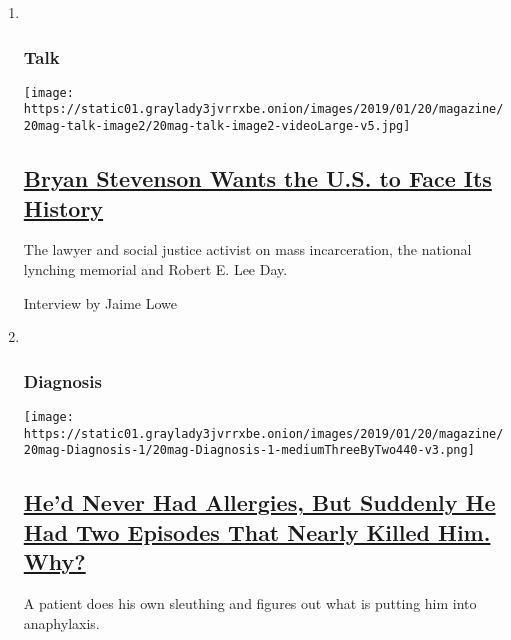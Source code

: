 \begin{enumerate}
\def\labelenumi{\arabic{enumi}.}
\item ~
  \hypertarget{talk}{%
  \subsubsection{Talk}\label{talk}}

  \texttt{[image: https://static01.graylady3jvrrxbe.onion/images/2019/01/20/magazine/20mag-talk-image2/20mag-talk-image2-videoLarge-v5.jpg]}

  \hypertarget{bryan-stevenson-wants-the-us-to-face-its-history}{%
  \subsection{\texorpdfstring{\href{/2019/01/16/magazine/bryan-stevenson-wants-the-us-to-face-its-history.html}{Bryan
  Stevenson Wants the U.S. to Face Its
  History}}{Bryan Stevenson Wants the U.S. to Face Its History}}\label{bryan-stevenson-wants-the-us-to-face-its-history}}

  The lawyer and social justice activist on mass incarceration, the
  national lynching memorial and Robert E. Lee Day.

  Interview by Jaime Lowe
\item ~
  \hypertarget{diagnosis}{%
  \subsubsection{Diagnosis}\label{diagnosis}}

  \texttt{[image: https://static01.graylady3jvrrxbe.onion/images/2019/01/20/magazine/20mag-Diagnosis-1/20mag-Diagnosis-1-mediumThreeByTwo440-v3.png]}

  \hypertarget{hed-never-had-allergies-but-suddenly-he-had-two-episodes-that-nearly-killed-him-why}{%
  \subsection{\texorpdfstring{\href{/2019/01/17/magazine/hed-never-had-allergies-but-suddenly-he-had-two-episodes-that-nearly-killed-him-why.html}{He'd
  Never Had Allergies, But Suddenly He Had Two Episodes That Nearly
  Killed Him.
  Why?}}{He'd Never Had Allergies, But Suddenly He Had Two Episodes That Nearly Killed Him. Why?}}\label{hed-never-had-allergies-but-suddenly-he-had-two-episodes-that-nearly-killed-him-why}}

  A patient does his own sleuthing and figures out what is putting him
  into anaphylaxis.


\end{enumerate}

